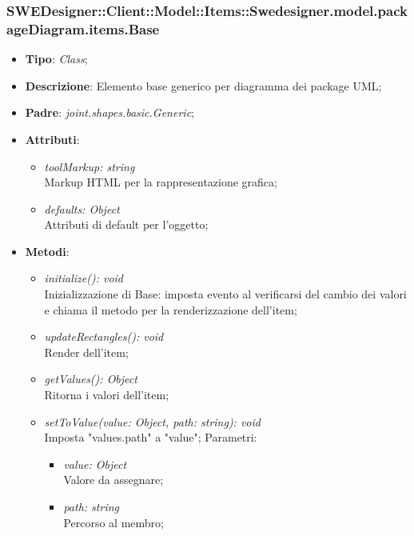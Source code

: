 \documentclass[../DefinizioneDiProdotto.tex]{subfiles}
\begin{document}
			\subsubsection{SWEDesigner::Client::Model::Items::Swedesigner.model.packageDiagram.items.Base}
			\hypertarget{SWEDesigner::Client::Model::Items::Swedesigner.model.packageDiagram.items.Base}{}
			\begin{itemize}
				\item \textbf{Tipo}: \emph{Class};
				\item \textbf{Descrizione}: Elemento base generico per diagramma dei package UML;
				\item \textbf{Padre}: \emph{joint.shapes.basic.Generic};
				\item \textbf{Attributi}:
				\begin{itemize}
					\item \emph{toolMarkup: string}\\
					Markup HTML per la rappresentazione grafica;
					\item \emph{defaults: Object}\\
					Attributi di default per l'oggetto;
				\end{itemize}
				\item \textbf{Metodi}:
				\begin{itemize}
					\item \emph{initialize(): void}\\
					Inizializzazione di Base: imposta evento al verificarsi del cambio dei valori e chiama il metodo per la renderizzazione dell'item;
					\item \emph{updateRectangles(): void}\\
					Render dell'item;
					\item \emph{getValues(): Object}\\
					Ritorna i valori dell'item;
					\item \emph{setToValue(value: Object, path: string): void}\\
					Imposta "values.path" a "value";
					Parametri:
					\begin{itemize}
						\item \emph{value: Object} \\
						Valore da assegnare;
						\item \emph{path: string} \\
						Percorso al membro;
					\end{itemize}
				\end{itemize}
			\end{itemize}
			
\end{document}
